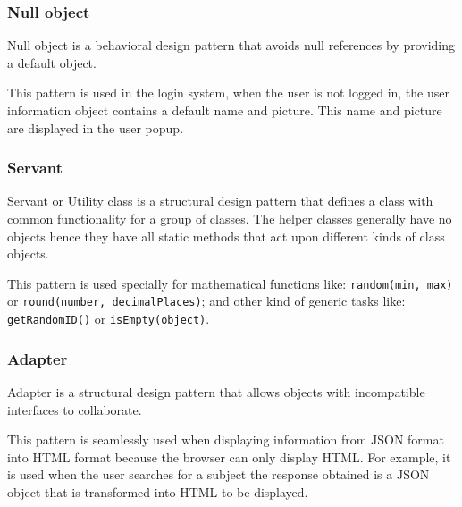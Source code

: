 \subsubsection*{Null object}

Null object is a behavioral design pattern that avoids null references by providing a default object.

This pattern is used in the login system, when the user is not logged in, the user information object contains a default name and picture. This name and picture are displayed in the user popup.

\subsubsection*{Servant}

Servant or Utility class is a structural design pattern that defines a class with common functionality for a group of classes. The helper classes generally have no objects hence they have all static methods that act upon different kinds of class objects.

This pattern is used specially for mathematical functions like: \texttt{random(min, max)} or \texttt{round(number, decimalPlaces)}; and other kind of generic tasks like: \texttt{getRandomID()} or \texttt{isEmpty(object)}.

\subsubsection*{Adapter}

Adapter is a structural design pattern that allows objects with incompatible interfaces to collaborate.\cite{refactoring-guru-adapter}

This pattern is seamlessly used when displaying information from JSON format into HTML format because the browser can only display HTML. For example, it is used when the user searches for a subject the response obtained is a JSON object that is transformed into HTML to be displayed.
